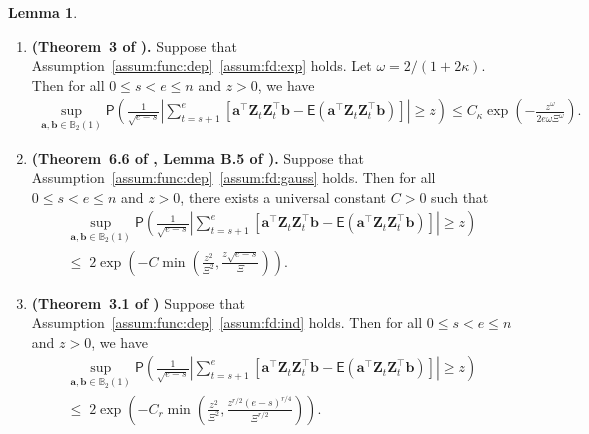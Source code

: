 \documentclass[11pt, a4paper]{article}
\newcommand{\mbf}{\mathbf}
\renewcommand{\l}{\left}
\renewcommand{\r}{\right}
\newcommand{\E}[0]{\mathsf{E}}
\newcommand{\p}{\mathsf{P}}
\theoremstyle{definition}
\theoremstyle{definition}
\theoremstyle{definition}
\newtheorem{lem}[thm]{Lemma}
\theoremstyle{definition}
\theoremstyle{definition}
\theoremstyle{remark}
\theoremstyle{definition}
\theoremstyle{definition}
\theoremstyle{definition}
\begin{document}
\begin{lem}
	\label{lem:exp}
	\begin{enumerate}[label = (\roman*)]
		\item \label{lem:exp:one} {\bf ({Theorem~3 of \citealp{wu2016performance}}).}
		Suppose that Assumption~\ref{assum:func:dep}~\ref{assum:fd:exp} holds.
		Let $\omega = 2/(1 + 2\kappa)$. Then for all $0 \le s < e \le n$ and $z > 0$, we have
		\begin{align*}
		\sup_{\mbf a, \mbf b \in \mathbb{B}_2(1)} \p\l(
		\frac{1}{\sqrt{e - s}} \l\vert \sum_{t = s + 1}^e \l[ \mbf a^\top \mbf Z_t \mbf Z_t^\top \mbf b - \E\l( \mbf a^\top \mbf Z_t \mbf Z_t^\top \mbf b\r) \r] \r\vert \ge z
		\r) \le C_\kappa \exp\l( - \frac{z^\omega}{2 e \omega \Xi^{\omega} } \r).
		\end{align*}
		
		\item \label{lem:exp:two} {\bf (Theorem~6.6 of \citealp{zhang2021convergence}, Lemma B.5 of \citealp{cho2022high}).} Suppose that Assumption~\ref{assum:func:dep}~\ref{assum:fd:gauss} holds. Then for all $0 \le s < e \le n$ and $z > 0$, there exists a universal constant $C > 0$ such that
		\begin{multline*}
		\sup_{\mbf a, \mbf b \in \mathbb{B}_2(1)} \p\l(
		\frac{1}{\sqrt{e - s}} \l\vert \sum_{t = s + 1}^e \l[ \mbf a^\top \mbf Z_t \mbf Z_t^\top \mbf b - \E\l( \mbf a^\top \mbf Z_t \mbf Z_t^\top \mbf b\r) \r] \r\vert \ge z \r) \\
		\le \; 2 \exp\l(- C \min\l(\frac{z^2}{\Xi^2}, \frac{z \sqrt{e - s} }{\Xi} \r) \r).
		\end{multline*}
		

        \item \label{lem:exp:three} {\bf (Theorem~3.1 of \citealp{KuCh22})} Suppose that Assumption~\ref{assum:func:dep}~\ref{assum:fd:ind} holds. Then for all $0 \le s < e \le n$ and $z > 0$, we have
		\begin{multline*}
		\sup_{\mbf a, \mbf b \in \mathbb{B}_2(1)} \p\l(
		\frac{1}{\sqrt{e - s}} \l\vert \sum_{t = s + 1}^e \l[ \mbf a^\top \mbf Z_t \mbf Z_t^\top \mbf b - \E\l( \mbf a^\top \mbf Z_t \mbf Z_t^\top \mbf b\r) \r] \r\vert \ge z \r) \\
		\le \; 2 \exp\l(- C_r \min\l(\frac{z^2}{\Xi^2}, \frac{z^{r/2} ({e - s})^{r/4}}{\Xi^{r/2}} \r) \r).
		\end{multline*}
	\end{enumerate}
\end{lem}
\end{document}
